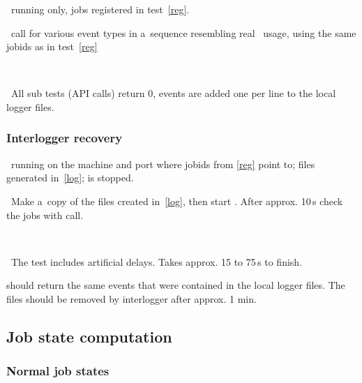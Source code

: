 \req\ running  only, jobs registered in test~\ref{reg}.

\what\ call  for various event types in a~sequence
resembling real \LB\ usage, using the same jobids as in test~\ref{reg}

\how\ 

\result\ All sub tests (API calls) return 0, events are added one per line to the local logger files.



\subsubsection{Interlogger recovery}
\label{recover}

\req\ running  on the machine and port where
jobids from \ref{reg} point to; files generated in~\ref{log};
 is stopped.

\what\ Make a~copy of the files created in~\ref{log}, then start
. After approx. 10\,s check the jobs
with  call.

\how\ 

\note\ The test includes artificial delays. Takes approx. 15 to 75\,s to finish.

\result {} should return the same events that were
contained in the local logger files. The files should be removed by
interlogger after approx. 1 min.





\subsection{Job state computation}

\subsubsection{Normal job states}
\label{state}

